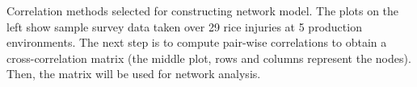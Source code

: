 Correlation methods selected for constructing network model. The plots on the left show sample survey data taken over 29 rice injuries at 5 production environments. The next step is to compute pair-wise correlations to obtain a cross-correlation matrix (the middle plot, rows and columns represent the nodes). Then, the matrix will be used for network analysis.
    \label{fig:pipeline1}